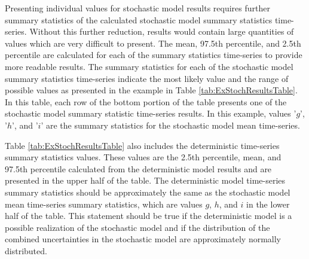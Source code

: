 Presenting individual values for stochastic model results requires further summary statistics of the calculated stochastic model summary statistics time-series.  Without this further reduction, results would contain large quantities of values which are very difficult to present.  The mean, 97.5th percentile, and 2.5th percentile are calculated for each of the summary statistics time-series to provide more readable results.  The summary statistics for each of the stochastic model summary statistics time-series indicate the most likely value and the range of possible values as presented in the example in Table \ref{tab:ExStochResultsTable}.  In this table, each row of the bottom portion of the table presents one of the stochastic model summary statistic time-series results.  In this example, values '$ g $', '$ h $', and '$ i $' are the summary statistics for the stochastic model mean time-series.

Table \ref{tab:ExStochResultsTable} also includes the deterministic time-series summary statistics values.  These values are the 2.5th percentile, mean, and 97.5th percentile calculated from the deterministic model results and are presented in the upper half of the table.  The deterministic model time-series summary statistics should be approximately the same as the stochastic model mean time-series summary statistics, which are values $ g $,  $ h $, and $ i $ in the lower half of the table.  This statement should be true if the deterministic model is a possible realization of the stochastic model and if the distribution of the combined uncertainties in the stochastic model are approximately normally distributed.

